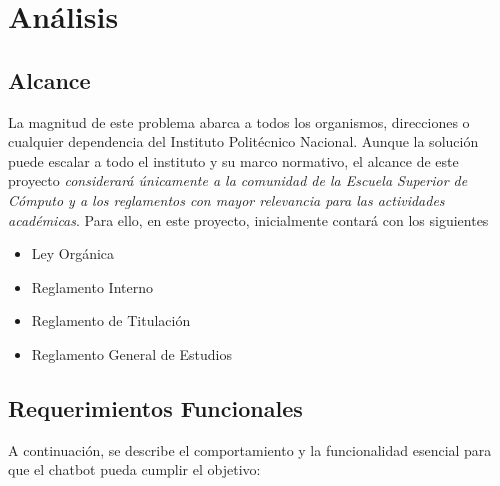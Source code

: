 \chapter{Análisis}

\section{Alcance}

La magnitud de este problema abarca a todos los organismos, direcciones o cualquier dependencia del Instituto Politécnico Nacional. Aunque la solución puede escalar a todo el instituto y su marco normativo, el alcance de este proyecto \textit{considerará únicamente a la comunidad de la Escuela Superior de Cómputo y a los reglamentos con mayor relevancia para las actividades académicas}. Para ello, en este proyecto, inicialmente contará con los siguientes 

\begin{itemize}
    \item Ley Orgánica
    \item Reglamento Interno
    \item Reglamento de Titulación
    \item Reglamento General de Estudios
\end{itemize}

\section{Requerimientos Funcionales}

A continuación, se describe el comportamiento y la funcionalidad esencial para que el chatbot pueda cumplir el objetivo:

